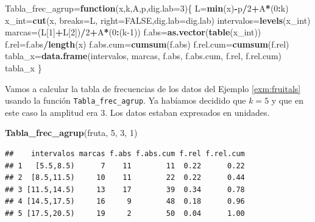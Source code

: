 \documentclass[]{book}
\newenvironment{Shaded}{\begin{snugshade}}{\end{snugshade}}
\newcommand{\ControlFlowTok}[1]{\textcolor[rgb]{0.13,0.29,0.53}{\textbf{#1}}}
\newcommand{\DataTypeTok}[1]{\textcolor[rgb]{0.13,0.29,0.53}{#1}}
\newcommand{\DecValTok}[1]{\textcolor[rgb]{0.00,0.00,0.81}{#1}}
\newcommand{\KeywordTok}[1]{\textcolor[rgb]{0.13,0.29,0.53}{\textbf{#1}}}
\newcommand{\NormalTok}[1]{#1}
\newcommand{\OperatorTok}[1]{\textcolor[rgb]{0.81,0.36,0.00}{\textbf{#1}}}
\newcommand{\OtherTok}[1]{\textcolor[rgb]{0.56,0.35,0.01}{#1}}
\theoremstyle{definition}
\theoremstyle{definition}
\theoremstyle{definition}
\theoremstyle{remark}
\let\BeginKnitrBlock\begin \let\EndKnitrBlock\end
\begin{document}
\begin{Shaded}
\begin{Highlighting}[]
\NormalTok{Tabla_frec_agrup=}\ControlFlowTok{function}\NormalTok{(x,k,A,p,}\DataTypeTok{dig.lab=}\DecValTok{3}\NormalTok{)\{}
\NormalTok{    L=}\KeywordTok{min}\NormalTok{(x)}\OperatorTok{-}\NormalTok{p}\OperatorTok{/}\DecValTok{2}\OperatorTok{+}\NormalTok{A}\OperatorTok{*}\NormalTok{(}\DecValTok{0}\OperatorTok{:}\NormalTok{k)}
\NormalTok{    x_int=}\KeywordTok{cut}\NormalTok{(x, }\DataTypeTok{breaks=}\NormalTok{L, }\DataTypeTok{right=}\OtherTok{FALSE}\NormalTok{,}\DataTypeTok{dig.lab=}\NormalTok{dig.lab)}
\NormalTok{    intervalos=}\KeywordTok{levels}\NormalTok{(x_int)}
\NormalTok{    marcas=(L[}\DecValTok{1}\NormalTok{]}\OperatorTok{+}\NormalTok{L[}\DecValTok{2}\NormalTok{])}\OperatorTok{/}\DecValTok{2}\OperatorTok{+}\NormalTok{A}\OperatorTok{*}\NormalTok{(}\DecValTok{0}\OperatorTok{:}\NormalTok{(k}\DecValTok{-1}\NormalTok{))}
\NormalTok{    f.abs=}\KeywordTok{as.vector}\NormalTok{(}\KeywordTok{table}\NormalTok{(x_int))}
\NormalTok{    f.rel=f.abs}\OperatorTok{/}\KeywordTok{length}\NormalTok{(x)}
\NormalTok{    f.abs.cum=}\KeywordTok{cumsum}\NormalTok{(f.abs)}
\NormalTok{    f.rel.cum=}\KeywordTok{cumsum}\NormalTok{(f.rel)}
\NormalTok{    tabla_x=}\KeywordTok{data.frame}\NormalTok{(intervalos, marcas, f.abs, f.abs.cum, f.rel, f.rel.cum)}
\NormalTok{    tabla_x}
\NormalTok{  \}}
\end{Highlighting}
\end{Shaded}

\BeginKnitrBlock{example}
\protect\hypertarget{exm:unnamed-chunk-663}{}{\label{exm:unnamed-chunk-663} }Vamos a calcular la tabla de frecuencias de los datos del Ejemplo \ref{exm:fruitals} usando la función \texttt{Tabla\_frec\_agrup}. Ya habíamos decidido que \(k=5\) y que en este caso la amplitud era 3. Los datos estaban expresados en unidades.
\EndKnitrBlock{example}

\begin{Shaded}
\begin{Highlighting}[]
\KeywordTok{Tabla_frec_agrup}\NormalTok{(fruta, }\DecValTok{5}\NormalTok{, }\DecValTok{3}\NormalTok{, }\DecValTok{1}\NormalTok{)}
\end{Highlighting}
\end{Shaded}

\begin{verbatim}
##    intervalos marcas f.abs f.abs.cum f.rel f.rel.cum
## 1   [5.5,8.5)      7    11        11  0.22      0.22
## 2  [8.5,11.5)     10    11        22  0.22      0.44
## 3 [11.5,14.5)     13    17        39  0.34      0.78
## 4 [14.5,17.5)     16     9        48  0.18      0.96
## 5 [17.5,20.5)     19     2        50  0.04      1.00
\end{verbatim}
\end{document}

